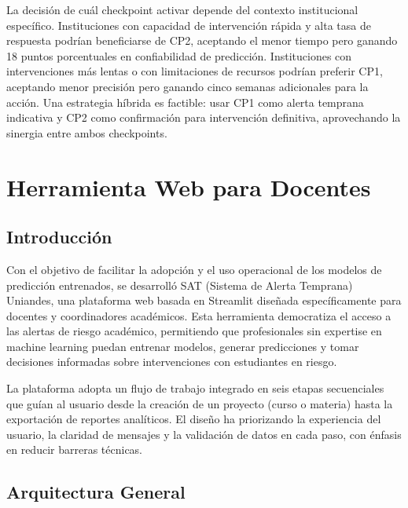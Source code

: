 \documentclass[12pt, letterpaper, openany]{report}
\begin{document}
La decisión de cuál checkpoint activar depende del contexto institucional específico. Instituciones con capacidad de intervención rápida y alta tasa de respuesta podrían beneficiarse de CP2, aceptando el menor tiempo pero ganando 18 puntos porcentuales en confiabilidad de predicción. Instituciones con intervenciones más lentas o con limitaciones de recursos podrían preferir CP1, aceptando menor precisión pero ganando cinco semanas adicionales para la acción. Una estrategia híbrida es factible: usar CP1 como alerta temprana indicativa y CP2 como confirmación para intervención definitiva, aprovechando la sinergia entre ambos checkpoints.

\FloatBarrier


\chapter{Herramienta Web para Docentes}
\label{cap:herramienta_web}

\section{Introducción}

Con el objetivo de facilitar la adopción y el uso operacional de los modelos de predicción entrenados, se desarrolló SAT (Sistema de Alerta Temprana) Uniandes, una plataforma web basada en Streamlit diseñada específicamente para docentes y coordinadores académicos. Esta herramienta democratiza el acceso a las alertas de riesgo académico, permitiendo que profesionales sin expertise en machine learning puedan entrenar modelos, generar predicciones y tomar decisiones informadas sobre intervenciones con estudiantes en riesgo.

La plataforma adopta un flujo de trabajo integrado en seis etapas secuenciales que guían al usuario desde la creación de un proyecto (curso o materia) hasta la exportación de reportes analíticos. El diseño ha priorizando la experiencia del usuario, la claridad de mensajes y la validación de datos en cada paso, con énfasis en reducir barreras técnicas.

\section{Arquitectura General}
\end{document}
